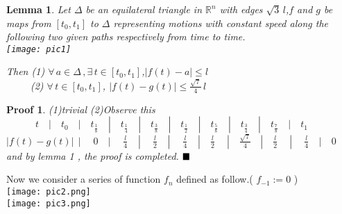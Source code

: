 \documentclass[12pt, a4paper]{article}
\newtheorem{lm}{Lemma}
\newtheorem{pf}{Proof}
\begin{document}
\begin{lm}
Let $\Delta$ be an equilateral triangle in $\mathbb{R}^{n}$ with edges $\sqrt{3}\,l$,$f$ and $g$ be maps from $[t_{0},t_{1}]$ to $\Delta$ representing motions with constant speed along the following two given paths respectively from time to time.\\
\texttt{[image: pic1]}

Then
(1) $\forall\, a\in\Delta\,,\exists\,  t \in[t_{0},t_{1}]$,$|f(t)-a|\leq l$
\\

$\qquad\;\:$(2) $\forall \,t\in[t_{0},t_{1}]$, $|f(t)-g(t)| \leq \frac{\sqrt{7}}{4}\,l$
\end{lm}
\begin{pf}
(1)trivial
(2)Observe this\\

$\qquad\quad t\quad|\quad 
t_{0}\quad|\quad t_{\frac{1}{8}}\quad|\quad t_{\frac{1}{4}}\quad|\quad t_{\frac{3}{8}}\quad|\quad t_{\frac{1}{2}}\quad|\quad t_{\frac{5}{8}}\quad|\quad t_{\frac{3}{4}}\quad|\quad t_{\frac{7}{8}}\quad|\quad
t_{1}$\\
$|f(t)-g(t)|\ \ |\quad\; 0\quad |\quad\;
\frac{l}{4}\;\;\;\:|\quad\ 
\frac{l}{2}\;\;\;\:|\quad\;
\frac{l}{4}\;\;\;\:|\quad
\frac{l}{2}\quad\ |\quad\!
\frac{\sqrt{7}}{4}\;\;\:\,|\quad
\frac{l}{2}\quad\ |\quad\ 
\frac{l}{4}\;\;\;\:|\quad
0$\\

and by lemma 1 , the proof is completed.
$\hfill\blacksquare$
\end{pf}
Now we consider a series of function $f_{n}$ defined as follow.( $f_{-1}:=0$ )\\

\texttt{[image: pic2.png]}\\
\texttt{[image: pic3.png]}\\
\end{document}
